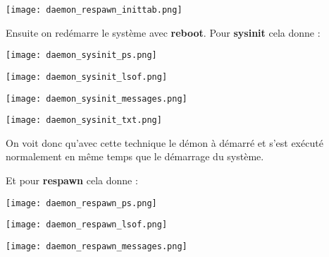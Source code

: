 \begin{center} 
\hspace{15cm}
\texttt{[image: daemon\_respawn\_inittab.png]}
\end{center}
\vspace{0.5cm}

Ensuite on redémarre le système avec \textbf{reboot}. Pour \textbf{sysinit} cela donne :

\begin{center} 
\hspace{15cm}
\texttt{[image: daemon\_sysinit\_ps.png]}
\end{center}
\vspace{0.5cm}

\begin{center} 
\hspace{15cm}
\texttt{[image: daemon\_sysinit\_lsof.png]}
\end{center}
\vspace{0.5cm}

\begin{center} 
\hspace{15cm}
\texttt{[image: daemon\_sysinit\_messages.png]}
\end{center}
\vspace{0.5cm}

\begin{center} 
\hspace{15cm}
\texttt{[image: daemon\_sysinit\_txt.png]}
\end{center}
\vspace{0.5cm}

On voit donc qu'avec cette technique le démon à démarré et s'est exécuté normalement en même temps que le démarrage du système.

Et pour \textbf{respawn} cela donne :

\begin{center} 
\hspace{15cm}
\texttt{[image: daemon\_respawn\_ps.png]}
\end{center}
\vspace{0.5cm}

\begin{center} 
\hspace{15cm}
\texttt{[image: daemon\_respawn\_lsof.png]}
\end{center}
\vspace{0.5cm}

\begin{center} 
\hspace{15cm}
\texttt{[image: daemon\_respawn\_messages.png]}
\end{center}
\vspace{0.5cm}

